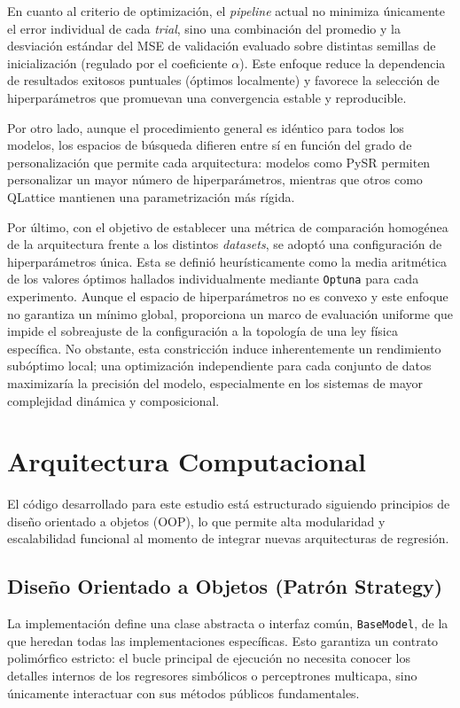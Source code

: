 \documentclass[11pt, a4paper]{article}
\begin{document}
En cuanto al criterio de optimización, el \textit{pipeline} actual no minimiza únicamente el error individual de cada \textit{trial}, sino una combinación del promedio y la desviación estándar del MSE de validación evaluado sobre distintas semillas de inicialización (regulado por el coeficiente $\alpha$). Este enfoque reduce la dependencia de resultados exitosos puntuales (óptimos localmente) y favorece la selección de hiperparámetros que promuevan una convergencia estable y reproducible.

Por otro lado, aunque el procedimiento general es idéntico para todos los modelos, los espacios de búsqueda difieren entre sí en función del grado de personalización que permite cada arquitectura: modelos como PySR permiten personalizar un mayor número de hiperparámetros, mientras que otros como QLattice mantienen una parametrización más rígida. 

Por último, con el objetivo de establecer una métrica de comparación homogénea de la arquitectura frente a los distintos \textit{datasets}, se adoptó una configuración de hiperparámetros única. Esta se definió heurísticamente como la media aritmética de los valores óptimos hallados individualmente mediante \texttt{Optuna} para cada experimento. Aunque el espacio de hiperparámetros no es convexo y este enfoque no garantiza un mínimo global, proporciona un marco de evaluación uniforme que impide el sobreajuste de la configuración a la topología de una ley física específica. No obstante, esta constricción induce inherentemente un rendimiento subóptimo local; una optimización independiente para cada conjunto de datos maximizaría la precisión del modelo, especialmente en los sistemas de mayor complejidad dinámica y composicional.

\section{Arquitectura Computacional}

El código desarrollado para este estudio está estructurado siguiendo principios de diseño orientado a objetos (OOP), lo que permite alta modularidad y escalabilidad funcional al momento de integrar nuevas arquitecturas de regresión.

\subsection{Diseño Orientado a Objetos (Patrón Strategy)}

La implementación define una clase abstracta o interfaz común, \texttt{BaseModel}, de la que heredan todas las implementaciones específicas. Esto garantiza un contrato polimórfico estricto: el bucle principal de ejecución no necesita conocer los detalles internos de los regresores simbólicos o perceptrones multicapa, sino únicamente interactuar con sus métodos públicos fundamentales.
\end{document}
